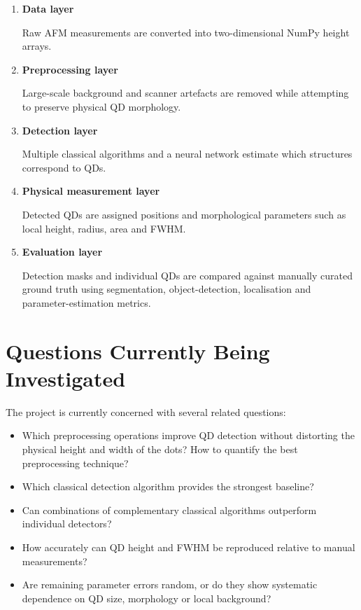 \documentclass[11pt,a4paper]{article}
\begin{document}
\begin{enumerate}[itemsep=4pt]

    \item \textbf{Data layer}

    Raw AFM measurements are converted into two-dimensional NumPy height arrays.

    \item \textbf{Preprocessing layer}

    Large-scale background and scanner artefacts are removed while attempting to preserve physical QD morphology.

    \item \textbf{Detection layer}

    Multiple classical algorithms and a neural network estimate which structures correspond to QDs.

    \item \textbf{Physical measurement layer}

    Detected QDs are assigned positions and morphological parameters such as local height, radius, area and FWHM.

    \item \textbf{Evaluation layer}

    Detection masks and individual QDs are compared against manually curated ground truth using segmentation, object-detection, localisation and parameter-estimation metrics.

\end{enumerate}


\section{Questions Currently Being Investigated}

The project is currently concerned with several related questions:

\begin{itemize}[itemsep=4pt]

    \item Which preprocessing operations improve QD detection without distorting the physical height and width of the dots? How to quantify the best preprocessing technique?

    \item Which classical detection algorithm provides the strongest baseline?

    \item Can combinations of complementary classical algorithms outperform individual detectors?

    \item How accurately can QD height and FWHM be reproduced relative to manual measurements?

    \item Are remaining parameter errors random, or do they show systematic dependence on QD size, morphology or local background?

\end{itemize}
\end{document}
